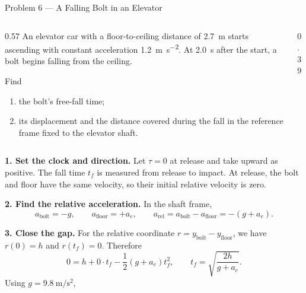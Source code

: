 \begin{frame}{Problem 6 — A Falling Bolt in an Elevator}
  \vspace{0.25em}
  \begin{columns}[T,onlytextwidth]
    \begin{column}{0.57\textwidth}
      \footnotesize
      An elevator car with a floor-to-ceiling distance of
      \SI{2.7}{\metre} starts ascending with constant acceleration
      \SI{1.2}{\metre\per\second\squared}. At \SI{2.0}{\second} after the
      start, a bolt begins falling from the ceiling.
      \vspace{0.45em}
      \begin{block}{Find}
        \begin{enumerate}
          \item the bolt's free-fall time;
          \item its displacement and the distance covered during the fall in
            the reference frame fixed to the elevator shaft.
        \end{enumerate}
      \end{block}
    \end{column}
    \begin{column}{0.39\textwidth}
      \centering
      \resizebox{0.86\textwidth}{!}{}
    \end{column}
  \end{columns}
\end{frame}

\begin{solutionframe}
  \footnotesize
  \textbf{1. Set the clock and direction.} Let $\tau=0$ at release and take
  upward as positive. The fall time $t_f$ is measured from release to impact.
  At release, the bolt and floor have the same velocity, so their initial
  relative velocity is zero.

  \textbf{2. Find the relative acceleration.} In the shaft frame,
  \[
    a_{\mathrm{bolt}}=-g,
    \qquad
    a_{\mathrm{floor}}=+a_e,
    \qquad
    a_{\mathrm{rel}}=a_{\mathrm{bolt}}-a_{\mathrm{floor}}
      =-(g+a_e).
  \]

  \textbf{3. Close the gap.} For the relative coordinate
  $r=y_{\mathrm{bolt}}-y_{\mathrm{floor}}$, we have
  $r(0)=h$ and $r(t_f)=0$. Therefore
  \[
    0=h+0\cdot t_f-\frac12(g+a_e)t_f^2,
    \qquad
    t_f=\sqrt{\frac{2h}{g+a_e}}.
  \]
  Using $g=\SI{9.8}{\metre\per\second\squared}$,
\end{solutionframe}

